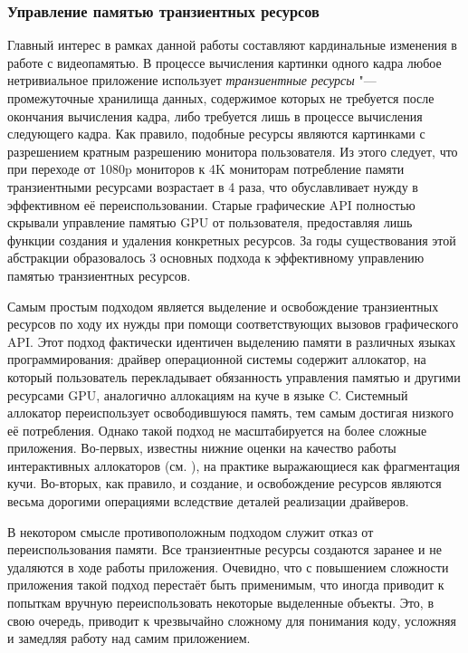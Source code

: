 \subsubsection{Управление памятью транзиентных ресурсов}
Главный интерес в рамках данной работы составляют кардинальные изменения в работе с видеопамятью.
В процессе вычисления картинки одного кадра любое нетривиальное приложение использует \textit{транзиентные ресурсы} "--- промежуточные хранилища данных, содержимое которых не требуется после окончания вычисления кадра, либо требуется лишь в процессе вычисления следующего кадра.
Как правило, подобные ресурсы являются картинками с разрешением кратным разрешению монитора пользователя.
Из этого следует, что при переходе от 1080p мониторов к 4K мониторам потребление памяти транзиентными ресурсами возрастает в 4 раза, что обуславливает нужду в эффективном её переиспользовании.
Старые графические API полностью скрывали управление памятью GPU от пользователя, предоставляя лишь функции создания и удаления конкретных ресурсов.
За годы существования этой абстракции образовалось 3 основных подхода к эффективному управлению памятью транзиентных ресурсов.

Самым простым подходом является выделение и освобождение транзиентных ресурсов по ходу их нужды при помощи соответствующих вызовов графического API.
Этот подход фактически идентичен выделению памяти в различных языках программирования: драйвер операционной системы содержит аллокатор, на который пользователь перекладывает обязанность управления памятью и другими ресурсами GPU, аналогично аллокациям на куче в языке C.
Системный аллокатор переиспользует освободившуюся память, тем самым достигая низкого её потребления.
Однако такой подход не масштабируется на более сложные приложения.
Во-первых, известны нижние оценки на качество работы интерактивных аллокаторов (см. \cite{robson1971estimate}), на практике выражающиеся как фрагментация кучи.
Во-вторых, как правило, и создание, и освобождение ресурсов являются весьма дорогими операциями вследствие деталей реализации драйверов.

В некотором смысле противоположным подходом служит отказ от переиспользования памяти.
Все транзиентные ресурсы создаются заранее и не удаляются в ходе работы приложения.
Очевидно, что с повышением сложности приложения такой подход перестаёт быть применимым, что иногда приводит к попыткам вручную переиспользовать некоторые выделенные объекты.
Это, в свою очередь, приводит к чрезвычайно сложному для понимания коду, усложняя и замедляя работу над самим приложением.

